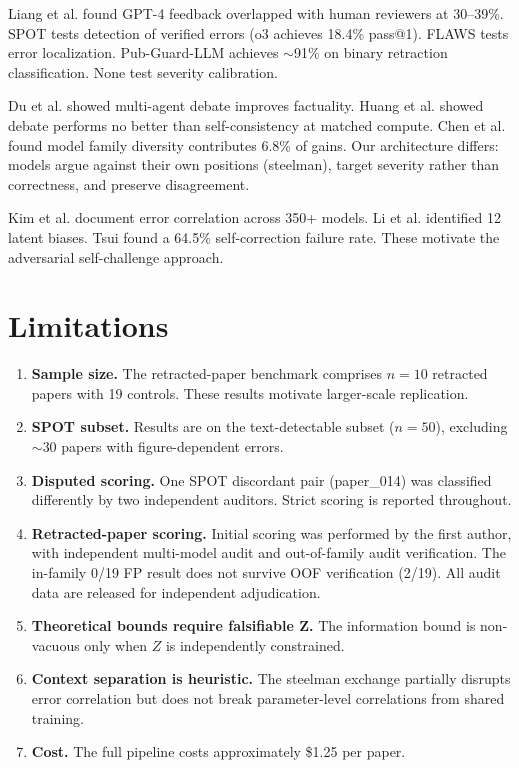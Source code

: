 \documentclass{ws-ijprai}
\begin{document}
Liang et al.\cite{liang2024feedback} found GPT-4 feedback overlapped with
human reviewers at 30--39\%. SPOT\cite{son2025spot} tests detection of
verified errors (o3 achieves 18.4\% pass@1).
FLAWS\cite{xi2025flaws} tests error localization.
Pub-Guard-LLM\cite{chen2025pubguard} achieves $\sim$91\% on binary retraction
classification. None test severity calibration.

Du et al.\cite{du2024debate} showed multi-agent debate improves factuality.
Huang et al.\cite{huang2024selfcorrect} showed debate performs no better than
self-consistency at matched compute. Chen et al.\cite{chen2024reconcile} found
model family diversity contributes 6.8\% of gains. Our architecture differs:
models argue against their own positions (steelman), target severity rather
than correctness, and preserve disagreement.

Kim et al.\cite{kim2025correlated} document error correlation across 350+
models. Li et al.\cite{li2024biases} identified 12 latent biases.
Tsui\cite{tsui2025blindspot} found a 64.5\% self-correction failure rate.
These motivate the adversarial self-challenge approach.


\section{Limitations}

\begin{enumerate}
\item \textbf{Sample size.} The retracted-paper benchmark comprises $n=10$
retracted papers with 19 controls. These results motivate larger-scale
replication.

\item \textbf{SPOT subset.} Results are on the text-detectable subset
($n=50$), excluding $\sim$30 papers with figure-dependent errors.

\item \textbf{Disputed scoring.} One SPOT discordant pair (paper\_014) was
classified differently by two independent auditors. Strict scoring is reported
throughout.

\item \textbf{Retracted-paper scoring.} Initial scoring was performed by the
first author, with independent multi-model audit and out-of-family audit
verification. The in-family 0/19 FP result does not survive OOF verification
(2/19). All audit data are released for independent adjudication.

\item \textbf{Theoretical bounds require falsifiable Z.} The information
bound is non-vacuous only when $Z$ is independently constrained.

\item \textbf{Context separation is heuristic.} The steelman exchange
partially disrupts error correlation but does not break parameter-level
correlations from shared training.

\item \textbf{Cost.} The full pipeline costs approximately \$1.25 per paper.
\end{enumerate}
\end{document}
